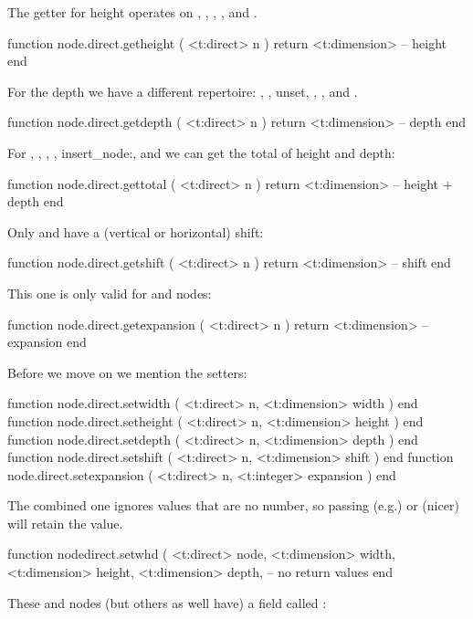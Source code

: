 The getter for height operates on , , ,
,  and .

\starttyping[option=LUA]
function node.direct.getheight ( <t:direct> n )
    return <t:dimension> -- height
end
\stoptyping

For the depth we have a different repertoire: , , \type
{unset}, , ,  and .

\starttyping[option=LUA]
function node.direct.getdepth ( <t:direct> n )
    return <t:dimension> -- depth
end
\stoptyping

For , , , , \type
{insert_node:},  and  we can get the total of height
and depth:

\starttyping[option=LUA]
function node.direct.gettotal ( <t:direct> n )
    return <t:dimension> -- height + depth
end
\stoptyping

Only  and  have a (vertical or horizontal) shift:

\starttyping[option=LUA]
function node.direct.getshift ( <t:direct> n )
    return <t:dimension> -- shift
end
\stoptyping

This one is only valid for  and  nodes:

\starttyping[option=LUA]
function node.direct.getexpansion ( <t:direct> n )
    return <t:dimension> -- expansion
end
\stoptyping

Before we move on we mention the setters:

\starttyping[option=LUA]
function node.direct.setwidth     ( <t:direct> n, <t:dimension> width     ) end
function node.direct.setheight    ( <t:direct> n, <t:dimension> height    ) end
function node.direct.setdepth     ( <t:direct> n, <t:dimension> depth     ) end
function node.direct.setshift     ( <t:direct> n, <t:dimension> shift     ) end
function node.direct.setexpansion ( <t:direct> n, <t:integer>   expansion ) end
\stoptyping

The combined one ignores values that are no number, so passing (e.g.) 
or (nicer)  will retain the value.

\starttyping[option=LUA]
function nodedirect.setwhd (
    <t:direct>    node,
    <t:dimension> width,
    <t:dimension> height,
    <t:dimension> depth,
    -- no return values
end
\stoptyping

These  and  nodes (but others as well have) a field
called :

